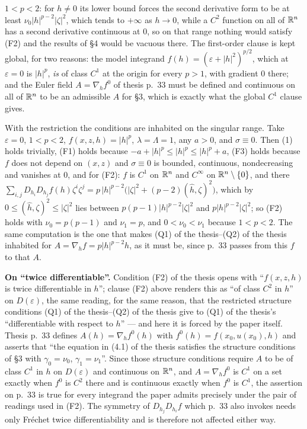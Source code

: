 \begin{definition}
$1<p<2$: for $h\ne0$ its lower bound forces the second derivative form to be at
least $\nu_0|h|^{p-2}|\zeta|^2$, which tends to $+\infty$ as $h\to0$, while a
$C^2$ function on all of $\mathbb{R}^n$ has a second derivative continuous at $0$, so on
that range nothing would satisfy (F2) and the results of \S4 would be vacuous
there.  The first-order clause is kept global, for two reasons: the model
integrand $f(h)=(\varepsilon+|h|^2)^{p/2}$, which at $\varepsilon=0$ is
$|h|^p$, \emph{is} of class $C^1$ at the origin for every $p>1$, with gradient
$0$ there; and the Euler field $A=\nabla_hf^0$ of thesis p.~33 must be defined
and continuous on all of $\mathbb{R}^n$ to be an admissible $A$ for \S3, which is
exactly what the global $C^1$ clause gives.

With the restriction the conditions are inhabited on the singular range.  Take
$\varepsilon=0$, $1<p<2$, $f(x,z,h)=|h|^p$, $\lambda=\Lambda=1$, any $a>0$, and
$\sigma\equiv0$.  Then (1) holds trivially, (F1) holds because
$-a+|h|^p\le|h|^p\le|h|^p+a$, (F3) holds because $f$ does not depend on $(x,z)$
and $\sigma\equiv0$ is bounded, continuous, nondecreasing and vanishes at $0$,
and for (F2): $f$ is $C^1$ on $\mathbb{R}^n$ and $C^\infty$ on $\mathbb{R}^n\setminus\{0\}$, and
there
$\sum_{i,j}D_{h_i}D_{h_j}f(h)\zeta^i\zeta^j
=p\,|h|^{p-2}\bigl(|\zeta|^2+(p-2)(\hat h,\zeta)^2\bigr)$,
which by $0\le(\hat h,\zeta)^2\le|\zeta|^2$ lies between
$p(p-1)|h|^{p-2}|\zeta|^2$ and $p|h|^{p-2}|\zeta|^2$; so (F2) holds with
$\nu_0=p(p-1)$ and $\nu_1=p$, and $0<\nu_0<\nu_1$ because $1<p<2$.  The same
computation is the one that makes (Q1) of the thesis--(Q2) of the thesis inhabited for
$A=\nabla_hf=p|h|^{p-2}h$, as it must be, since p.~33 passes from this $f$ to
that $A$.

\textbf{On ``twice differentiable''.}  Condition (F2) of the thesis opens with
``$f(x,z,h)$ is twice differentiable in $h$''; clause (F2) above renders this as
``of class $C^2$ in $h$'' on $D(\varepsilon)$, the same reading, for the same reason, that the
restricted structure conditions (Q1) of the thesis--(Q2) of the thesis give to
(Q1) of the thesis's ``differentiable with respect to $h$'' --- and here it is forced
by the paper itself.  Thesis p.~33
defines $A(h)=\nabla_hf^0(h)$ with $f^0(h)=f(x_0,u(x_0),h)$ and asserts that
``the equation in (4.1) of the thesis satisfies the structure conditions of \S3 with
$\gamma_0=\nu_0$, $\gamma_1=\nu_1$''.  Since those structure conditions require
$A$ to be of class $C^1$ in $h$ on $D(\varepsilon)$ and continuous on $\mathbb{R}^n$, and
$A=\nabla_hf^0$ is $C^1$ on a set exactly when $f^0$ is $C^2$ there and is
continuous exactly when $f^0$ is $C^1$, the assertion on p.~33 is true for every
integrand the paper admits precisely under the pair of readings used in (F2).
The symmetry of $D_{h_j}D_{h_i}f$ which p.~33 also invokes needs only Fr\'echet
twice differentiability and is therefore not affected either way.
\end{definition}
